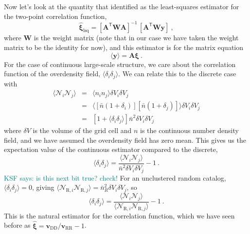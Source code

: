 \documentclass[modern]{aastex62}
\newcommand{\inv}{^{-1}}
\newcommand{\T}{^{\mathsf{T}}}
\newcommand{\bld}[1]{\bm{#1}}
\newcommand{\vv}[1]{\bld{v}_\mathrm{#1}}
\newcommand{\KSF}[1]{\textcolor{teal}{KSF says: #1}}
\begin{document}
Now let's look at the quantity that \cite{Tessore2018} identified as the least-squares estimator for the two-point correlation function,
\begin{equation}
    \bld{\hat{\xi}}_\mathrm{lsq} = [\bld{A}\T \bld{W} \bld{A}]\inv \, [\bld{A}\T \bld{W} \bld{y}] ~,
\end{equation}
where $\bld{W}$ is the weight matrix (note that in our case we have taken the weight matrix to be the identity for now), and this estimator is for the matrix equation
\begin{equation}
    \langle \bld{y} \rangle = \bld{A} \bld{\xi} ~.
\end{equation}
For the case of continuous large-scale structure, we care about the correlation function of the overdensity field, $\langle \delta_i \delta_j \rangle$.
We can relate this to the discrete case with
\begin{eqnarray}
    \langle \mathcal{N}_i \mathcal{N}_j \rangle &=& \langle n_i n_j \rangle \delta V_i \delta V_j \\
    &=& \langle [\bar{n}(1+\delta_i)] [\bar{n}(1+\delta_j)] \rangle \delta V_i \delta V_j \\
    &=& [1 + \langle \delta_i \delta_j \rangle] \bar{n}^2 \delta V_i \delta V_j
\end{eqnarray}
where $\delta V$ is the volume of the grid cell and $n$ is the continuous number density field, and we have assumed the overdensity field has zero mean.
This gives us the expectation value of the continuous estimator compared to the discrete, 
\begin{equation}
    \langle \delta_i \delta_j \rangle = \frac{\langle \mathcal{N}_i \mathcal{N}_j \rangle}{\bar{n}^2  \delta V_i \delta V_j} - 1 ~.
\end{equation}
\KSF{is this next bit true? check!}
For an unclustered random catalog, $\langle \delta_i \delta_j \rangle = 0$, giving $\langle \mathcal{N}_{\mathrm{R},i} \mathcal{N}_{\mathrm{R},j} \rangle = \bar{n}_R^2  \delta V_i \delta V_j$, so 
\begin{equation}
    \langle \delta_i \delta_j \rangle = \frac{\langle \mathcal{N}_i \mathcal{N}_j \rangle}{\langle \mathcal{N}_{\mathrm{R},i} \mathcal{N}_{\mathrm{R},j} \rangle} - 1 ~.
\end{equation}
This is the natural estimator for the correlation function, which we have seen before as $\bld{\hat{\xi}} = \vv{DD}/\vv{RR} - 1$.
\end{document}
